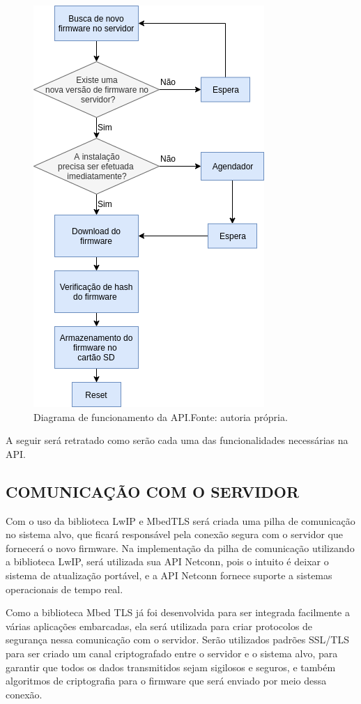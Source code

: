 \begin{figure}[H]
    \scriptsize
     \centering
     \includegraphics[scale=0.9]{dados/figuras/DiagAPI.png}
     \caption{Diagrama de funcionamento da API.\newline Fonte: autoria própria.}
     \label{fig:DiagAPI}
\end{figure}

A seguir será retratado como serão cada uma das funcionalidades necessárias na API.

\subsection{COMUNICAÇÃO COM O SERVIDOR}

Com o uso da biblioteca LwIP e MbedTLS será criada uma pilha de comunicação no sistema alvo, que ficará responsável pela conexão segura com o servidor que fornecerá o novo firmware. Na implementação da pilha de comunicação utilizando a  biblioteca LwIP, será utilizada sua API Netconn, pois o intuito é deixar o sistema de atualização portável, e a API Netconn fornece suporte a sistemas operacionais de tempo real.

Como a biblioteca Mbed TLS já foi desenvolvida para ser integrada facilmente a várias aplicações embarcadas, ela será utilizada para criar protocolos de segurança nessa comunicação com o servidor. Serão utilizados padrões SSL/TLS para ser criado um canal criptografado entre o servidor e o sistema alvo, para garantir que todos os dados transmitidos sejam sigilosos e seguros, e também algoritmos de criptografia para o firmware que será enviado por meio dessa conexão.

